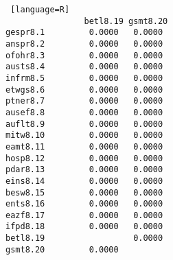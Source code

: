 \begin{lstlisting} [language=R]
                betl8.19 gsmt8.20 
gespr8.1         0.0000   0.0000            
anspr8.2         0.0000   0.0000          
ofohr8.3         0.0000   0.0000             
austs8.4         0.0000   0.0000             
infrm8.5         0.0000   0.0000             
etwgs8.6         0.0000   0.0000             
ptner8.7         0.0000   0.0000            
ausef8.8         0.0000   0.0000             
auflt8.9         0.0000   0.0000            
mitw8.10         0.0000   0.0000            
eamt8.11         0.0000   0.0000             
hosp8.12         0.0000   0.0000             
pdar8.13         0.0000   0.0000             
eins8.14         0.0000   0.0000           
besw8.15         0.0000   0.0000             
ents8.16         0.0000   0.0000             
eazf8.17         0.0000   0.0000             
ifpd8.18         0.0000   0.0000            
betl8.19                  0.0000             
gsmt8.20         0.0000                      
                   
\end{lstlisting}